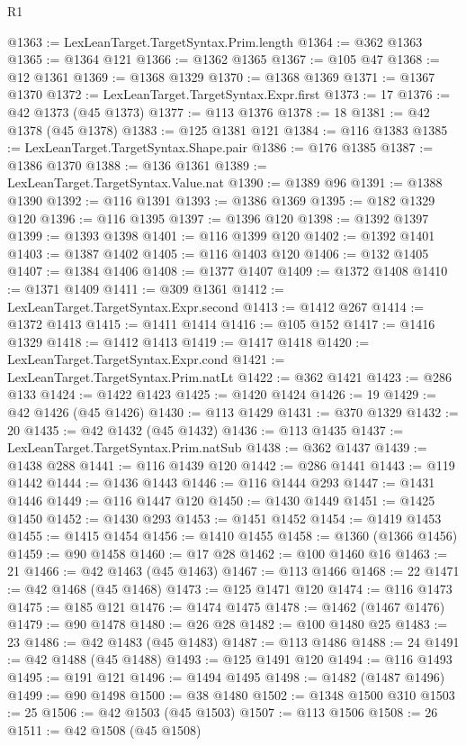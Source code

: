 \begin{lexlean}{R1}
\begin{coremodule}
@1363 := LexLeanTarget.TargetSyntax.Prim.length
@1364 := @362 @1363
@1365 := @1364 @121
@1366 := @1362 @1365
@1367 := @105 @47
@1368 := @12 @1361
@1369 := @1368 @1329
@1370 := @1368 @1369
@1371 := @1367 @1370
@1372 := LexLeanTarget.TargetSyntax.Expr.first
@1373 := 17
@1376 := @42 @1373 (@45 @1373)
@1377 := @113 @1376
@1378 := 18
@1381 := @42 @1378 (@45 @1378)
@1383 := @125 @1381 @121
@1384 := @116 @1383
@1385 := LexLeanTarget.TargetSyntax.Shape.pair
@1386 := @176 @1385
@1387 := @1386 @1370
@1388 := @136 @1361
@1389 := LexLeanTarget.TargetSyntax.Value.nat
@1390 := @1389 @96
@1391 := @1388 @1390
@1392 := @116 @1391
@1393 := @1386 @1369
@1395 := @182 @1329 @120
@1396 := @116 @1395
@1397 := @1396 @120
@1398 := @1392 @1397
@1399 := @1393 @1398
@1401 := @116 @1399 @120
@1402 := @1392 @1401
@1403 := @1387 @1402
@1405 := @116 @1403 @120
@1406 := @132 @1405
@1407 := @1384 @1406
@1408 := @1377 @1407
@1409 := @1372 @1408
@1410 := @1371 @1409
@1411 := @309 @1361
@1412 := LexLeanTarget.TargetSyntax.Expr.second
@1413 := @1412 @267
@1414 := @1372 @1413
@1415 := @1411 @1414
@1416 := @105 @152
@1417 := @1416 @1329
@1418 := @1412 @1413
@1419 := @1417 @1418
@1420 := LexLeanTarget.TargetSyntax.Expr.cond
@1421 := LexLeanTarget.TargetSyntax.Prim.natLt
@1422 := @362 @1421
@1423 := @286 @133
@1424 := @1422 @1423
@1425 := @1420 @1424
@1426 := 19
@1429 := @42 @1426 (@45 @1426)
@1430 := @113 @1429
@1431 := @370 @1329
@1432 := 20
@1435 := @42 @1432 (@45 @1432)
@1436 := @113 @1435
@1437 := LexLeanTarget.TargetSyntax.Prim.natSub
@1438 := @362 @1437
@1439 := @1438 @288
@1441 := @116 @1439 @120
@1442 := @286 @1441
@1443 := @119 @1442
@1444 := @1436 @1443
@1446 := @116 @1444 @293
@1447 := @1431 @1446
@1449 := @116 @1447 @120
@1450 := @1430 @1449
@1451 := @1425 @1450
@1452 := @1430 @293
@1453 := @1451 @1452
@1454 := @1419 @1453
@1455 := @1415 @1454
@1456 := @1410 @1455
@1458 := @1360 (@1366 @1456)
@1459 := @90 @1458
@1460 := @17 @28
@1462 := @100 @1460 @16
@1463 := 21
@1466 := @42 @1463 (@45 @1463)
@1467 := @113 @1466
@1468 := 22
@1471 := @42 @1468 (@45 @1468)
@1473 := @125 @1471 @120
@1474 := @116 @1473
@1475 := @185 @121
@1476 := @1474 @1475
@1478 := @1462 (@1467 @1476)
@1479 := @90 @1478
@1480 := @26 @28
@1482 := @100 @1480 @25
@1483 := 23
@1486 := @42 @1483 (@45 @1483)
@1487 := @113 @1486
@1488 := 24
@1491 := @42 @1488 (@45 @1488)
@1493 := @125 @1491 @120
@1494 := @116 @1493
@1495 := @191 @121
@1496 := @1494 @1495
@1498 := @1482 (@1487 @1496)
@1499 := @90 @1498
@1500 := @38 @1480
@1502 := @1348 @1500 @310
@1503 := 25
@1506 := @42 @1503 (@45 @1503)
@1507 := @113 @1506
@1508 := 26
@1511 := @42 @1508 (@45 @1508)

\end{coremodule}
\end{lexlean}

